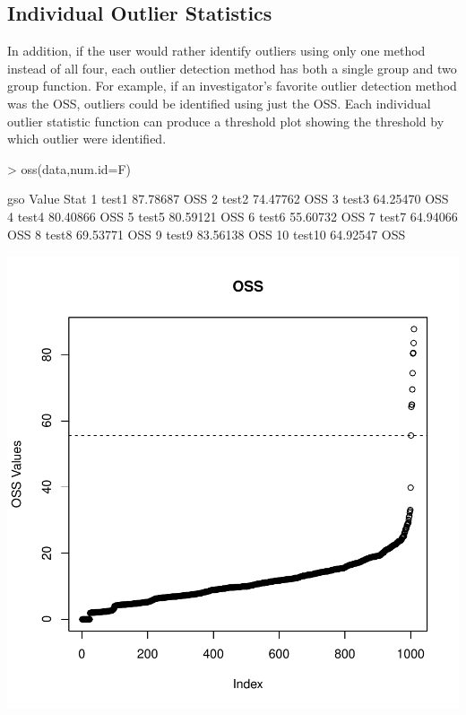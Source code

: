 \documentclass[11pt, a4paper]{article}
\begin{document}
\subsection{Individual Outlier Statistics}
In addition, if the user would rather identify outliers using only one method instead of all four, each outlier detection method has both a single group and two group function. For example, if an investigator's favorite outlier detection method was the OSS, outliers could be identified using just the OSS. Each individual outlier statistic function can produce a threshold plot showing the threshold by which outlier were identified.
\begin{Schunk}
\begin{Sinput}
> oss(data,num.id=F)
\end{Sinput}
\begin{Soutput}
      gso    Value Stat
1   test1 87.78687  OSS
2   test2 74.47762  OSS
3   test3 64.25470  OSS
4   test4 80.40866  OSS
5   test5 80.59121  OSS
6   test6 55.60732  OSS
7   test7 64.94066  OSS
8   test8 69.53771  OSS
9   test9 83.56138  OSS
10 test10 64.92547  OSS
\end{Soutput}
\end{Schunk}
\includegraphics{roapkg-009}
\end{document}

